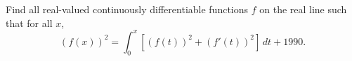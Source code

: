 Find all real-valued continuously differentiable functions $f$
on the real line such that for all $x$,
\[
(f(x))^2 = \int_0^x [(f(t))^2 + (f'(t))^2]\,dt + 1990.
\]
